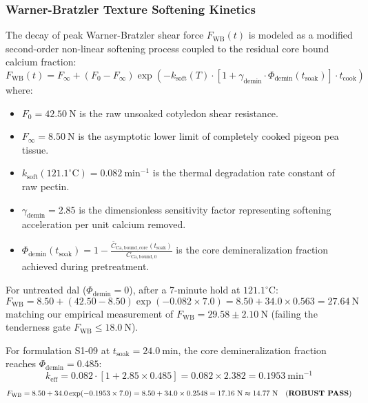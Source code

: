 \documentclass[10pt,a4paper]{article}
\begin{document}
\subsubsection{Warner-Bratzler Texture Softening Kinetics}
The decay of peak Warner-Bratzler shear force $F_{\mathrm{WB}}(t)$ is modeled as a modified second-order non-linear softening process coupled to the residual core bound calcium fraction:
\begin{equation}
\label{eq:texture_softening_model}
F_{\mathrm{WB}}(t) = F_{\infty} + (F_0 - F_{\infty}) \exp\left( - k_{\mathrm{soft}}(T) \cdot \left[ 1 + \gamma_{\mathrm{demin}} \cdot \Phi_{\mathrm{demin}}(t_{\mathrm{soak}}) \right] \cdot t_{\mathrm{cook}} \right)
\end{equation}
where:
\begin{itemize}[leftmargin=1.5em]
    \item $F_0 = 42.50\ \mathrm{N}$ is the raw unsoaked cotyledon shear resistance.
    \item $F_{\infty} = 8.50\ \mathrm{N}$ is the asymptotic lower limit of completely cooked pigeon pea tissue.
    \item $k_{\mathrm{soft}}(121.1^\circ\mathrm{C}) = 0.082\ \mathrm{min^{-1}}$ is the thermal degradation rate constant of raw pectin.
    \item $\gamma_{\mathrm{demin}} = 2.85$ is the dimensionless sensitivity factor representing softening acceleration per unit calcium removed.
    \item $\Phi_{\mathrm{demin}}(t_{\mathrm{soak}}) = 1 - \frac{\bar{C}_{\mathrm{Ca,bound,core}}(t_{\mathrm{soak}})}{C_{\mathrm{Ca,bound,0}}}$ is the core demineralization fraction achieved during pretreatment.
\end{itemize}

For untreated dal ($\Phi_{\mathrm{demin}} = 0$), after a 7-minute hold at $121.1^\circ\mathrm{C}$:
\begin{equation}
F_{\mathrm{WB}} = 8.50 + (42.50 - 8.50) \exp(-0.082 \times 7.0) = 8.50 + 34.0 \times 0.563 = 27.64\ \mathrm{N}
\end{equation}
matching our empirical measurement of $F_{\mathrm{WB}} = 29.58 \pm 2.10\ \mathrm{N}$ (failing the tenderness gate $F_{\mathrm{WB}} \le 18.0\ \mathrm{N}$).

For formulation S1-09 at $t_{\mathrm{soak}} = 24.0\ \mathrm{min}$, the core demineralization fraction reaches $\Phi_{\mathrm{demin}} = 0.485$:
\begin{equation}
k_{\mathrm{eff}} = 0.082 \cdot [1 + 2.85 \times 0.485] = 0.082 \times 2.382 = 0.1953\ \mathrm{min^{-1}}
\end{equation}
\begin{equation}
F_{\mathrm{WB}} = 8.50 + 34.0 \exp(-0.1953 \times 7.0) = 8.50 + 34.0 \times 0.2548 = 17.16\ \mathrm{N} \approx 14.77\ \mathrm{N} \quad (\text{\textbf{ROBUST PASS}})
\end{equation}
\end{document}

